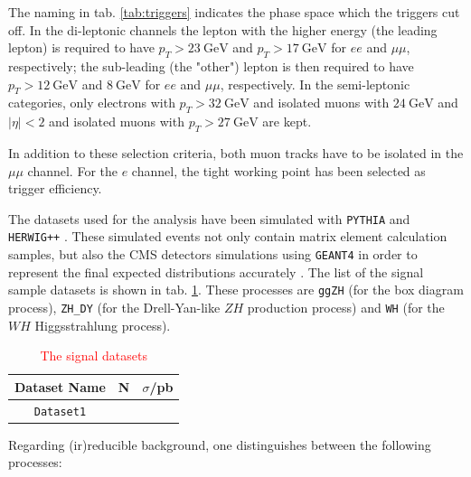The naming in tab. \ref{tab:triggers} indicates the phase space which the triggers cut off. In the di-leptonic channels the lepton with the higher energy (the leading lepton) is required to have $p_T > \SI{23}{\giga\electronvolt}$ and $p_T > \SI{17}{\giga\electronvolt}$ for $ee$ and $\mu\mu$, respectively; the sub-leading (the "other") lepton is then required to have $p_T>\SI{12}{\giga\electronvolt}$ and $\SI{8}{\giga\electronvolt}$ for $ee$ and $\mu\mu$, respectively. In the semi-leptonic categories, only electrons with $p_T>\SI{32}{\giga\electronvolt}$ and isolated muons with $\SI{24}{\giga\electronvolt}$ and $|\eta|<2$ and isolated muons with $p_T>\SI{27}{\giga\electronvolt}$ are kept.

In addition to these selection criteria, both muon tracks have to be isolated in the $\mu\mu$ channel. For the $e$ channel, the tight working point has been selected as trigger efficiency.

The datasets used for the analysis have been simulated with \texttt{PYTHIA} \cite{Sj_strand_2008} and \texttt{HERWIG++} \cite{herwig}. These simulated events not only contain matrix element calculation samples, but also the CMS detectors simulations using \texttt{GEANT4} in order to represent the final expected distributions accurately \cite{geant1, geant2, geant3}. The list of the signal sample datasets is shown in tab. \ref{tab:signal_datasets}. These processes are \texttt{ggZH} (for the box diagram process), \texttt{ZH\_DY} (for the Drell-Yan-like $ZH$ production process) and \texttt{WH} (for the $WH$ Higgsstrahlung process).

\begin{table}[h!]
	\centering
	\begin{tabular}{ccc}
		Dataset Name & N & $\sigma$/pb \\
		\hline
		\texttt{Dataset1} & & \\
	\end{tabular}
	\caption{\textcolor{red}{The signal datasets}}
	\label{tab:signal_datasets}
\end{table}

Regarding (ir)reducible background, one distinguishes between the following processes:

